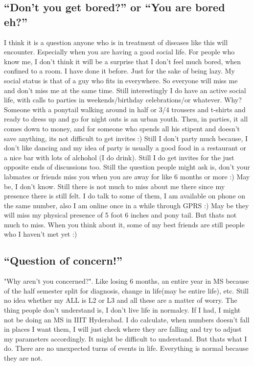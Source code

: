 \subsection*{``Don't you get bored?'' or ``You are bored eh?''} 

I think it is a question anyone who is in treatment of diseases like this will encounter. 
Especially when you are having a good social life. For people who know me, I don't think it
will be a surprise that I don't feel much bored, when confined to a room. I have done it before.
Just for the sake of being lazy. My social status is that of a guy who fits in everywhere. So 
everyone will miss me and don't miss me at the same time. Still interestingly I do have an active
social life, with calls to parties in weekends/birthday celebrations/or whatever. Why? Someone
with a ponytail walking around in half or 3/4 trousers and t-shirts and ready to dress up and 
go for night outs is an urban youth. Then, in parties, it all comes down to money, and for 
someone who spends all his stipent and doesn't save anything, its not difficult to get invites
:) Still I don't party much because, I don't like dancing and my idea of party is usually a good
food in a restaurant or a nice bar with lots of alchohol (I do drink). Still I do get invites
for the just opposite ends of discussions too. Still the question people might ask is, don't
your labmates or friends miss you when you are away for like 6 months or more :) May be, I don't
know. Still there is not much to miss about me there since my presence there is still felt. I do
talk to some of them, I am available on phone on the same number, also I am online once in a while
through GPRS :) May be they will miss my physical presence of 5 foot 6 inches and pony tail. But
thats not much to miss. When you think about it, some of my best friends are still people who I
haven't met yet :) 

\subsection*{``Question of concern!''} 

"Why aren't you concerned?". Like losing 6 months, an entire year in MS because of the half 
semester split for diagnosis, change in life(may be entire life), etc. Still no idea whether my
ALL is L2 or L3 and all these are a matter of worry. The thing people don't understand is, I 
don't live life in normalcy. If I had, I might not be doing an MS in IIIT Hyderabad. I do 
calculate, when numbers doesn't fall in places I want them, I will just check where they are 
falling and try to adjust my parameters accordingly. It might be difficult to understand. But
thats what I do. There are no unexpected turns of events in life. Everything is normal because
they are not.

